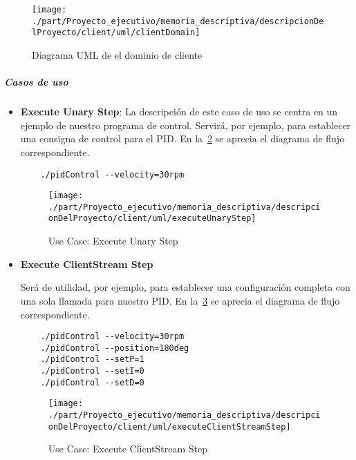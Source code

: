 \begin{figure}[H]
    \centering
    \texttt{[image: ./part/Proyecto\_ejecutivo/memoria\_descriptiva/descripcionDelProyecto/client/uml/clientDomain]}
    \caption{Diagrama UML de el dominio de cliente}\label{fig:Diagrama UML de el dominio de cliente}
\end{figure}

\subparagraph{Casos de uso}

\begin{itemize}
    \item \textbf{Execute Unary Step}: La descripción de este caso de uso se centra en un ejemplo de nuestro programa de control.
    Servirá, por ejemplo, para establecer una consigna de control para el PID\@.
    En la~\cref{fig:Use Case-Execute Unary Step} se aprecia el diagrama de flujo correspondiente.

    \begin{verbatim}
    ./pidControl --velocity=30rpm
    \end{verbatim}

    \begin{figure}[H]
        \centering
        \texttt{[image: ./part/Proyecto\_ejecutivo/memoria\_descriptiva/descripcionDelProyecto/client/uml/executeUnaryStep]}
        \caption{Use Case: Execute Unary Step}\label{fig:Use Case-Execute Unary Step}
    \end{figure}

    \item \textbf{Execute ClientStream Step}

    Será de utilidad, por ejemplo, para establecer una configuración completa con una sola llamada para nuestro PID\@.
    En la~\cref{fig:Use Case-Execute ClientStream Step} se aprecia el diagrama de flujo correspondiente.
    \begin{verbatim}
    ./pidControl --velocity=30rpm
    ./pidControl --position=180deg
    ./pidControl --setP=1
    ./pidControl --setI=0
    ./pidControl --setD=0
    \end{verbatim}

    \begin{figure}[H]
        \centering
        \texttt{[image: ./part/Proyecto\_ejecutivo/memoria\_descriptiva/descripcionDelProyecto/client/uml/executeClientStreamStep]}
        \caption{Use Case: Execute ClientStream Step}\label{fig:Use Case-Execute ClientStream Step}
    \end{figure}


\end{itemize}
